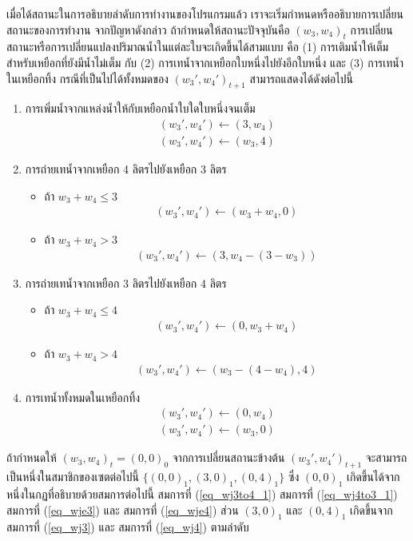 \par{
เมื่อได้สถานะในการอธิบายลำดับการทำงานของโปรแกรมแล้ว 
เราจะเริ่มกำหนดหรืออธิบายการเปลี่ยนสถานะของการทำงาน
จากปัญหาดังกล่าว 
ถ้ากำหนดให้สถานะปัจจุบันคือ $(w_3, w_4)_t$ 
การเปลี่ยนสถานะหรือการเปลี่ยนแปลงปริมาณน้ำในแต่ละใบจะเกิดขึ้นได้สามแบบ
คือ (1) การเติมน้ำให้เต็มสำหรับเหยือกที่ยังมีน้ำไม่เต็ม กับ 
(2) การเทน้ำจากเหยือกใบหนึ่งไปยังอีกใบหนึ่ง และ (3) การเทน้ำในเหยือกทิ้ง
กรณีที่เป็นไปได้ทั้งหมดของ $(w_3',w_4')_{t+1}$ 
สามารถแสดงได้ดังต่อไปนี้
\begin{enumerate}
\item การเพิ่มน้ำจากแหล่งน้ำให้กับเหยือกน้ำใบใดใบหนึ่งจนเต็ม 
\begin{eqnarray}
(w_3',w_4') \leftarrow (3, w_4) \label{eq_wj3} \\
(w_3',w_4') \leftarrow (w_3, 4) \label{eq_wj4}
\end{eqnarray}
\item การถ่ายเทน้ำจากเหยือก 4 ลิตรไปยังเหยือก 3 ลิตร
\begin{itemize}
\item ถ้า $w_3 + w_4 \le 3$ 
\begin{eqnarray}
(w_3',w_4') \leftarrow (w_3+w_4, 0) \label{eq_wj4to3_1}
\end{eqnarray}
\item ถ้า $w_3 + w_4 > 3$ 
\begin{eqnarray}
(w_3',w_4') \leftarrow (3, w_4-(3-w_3)) \label{eq_wj4to3_2}
\end{eqnarray}
\end{itemize}
\item การถ่ายเทน้ำจากเหยือก 3 ลิตรไปยังเหยือก 4 ลิตร
\begin{itemize}
\item ถ้า $w_3 + w_4 \le 4$ 
\begin{eqnarray}
(w_3',w_4') \leftarrow (0, w_3+w_4) \label{eq_wj3to4_1}
\end{eqnarray}
\item ถ้า $w_3 + w_4 > 4$ 
\begin{eqnarray}
(w_3',w_4') \leftarrow (w_3-(4-w_4),4) \label{eq_wj3to4_2}
\end{eqnarray}
\end{itemize}
\item การเทน้ำทั้งหมดในเหยือกทิ้ง
\begin{eqnarray}
(w_3',w_4') \leftarrow (0, w_4) \label{eq_wje3} \\
(w_3',w_4') \leftarrow (w_3, 0) \label{eq_wje4}
\end{eqnarray}
\end{enumerate}
%
ถ้ากำหนดให้ $(w_3,w_4)_t = (0,0)_0$ จากการเปลี่ยนสถานะข้างต้น $(w_3',w_4')_{t+1}$ 
จะสามารถเป็นหนึ่งในสมาชิกของเซตต่อไปนี้ $\{(0,0)_1,(3,0)_1,(0,4)_1\}$ ซึ่ง 
$(0,0)_1$ เกิดขึ้นได้จากหนึ่งในกฏที่อธิบายด้วยสมการต่อไปนี้ สมการที่ (\ref{eq_wj3to4_1})  
สมการที่ (\ref{eq_wj4to3_1}) สมการที่ (\ref{eq_wje3}) และ 
สมการที่ (\ref{eq_wje4})
ส่วน $(3,0)_1$ และ $(0,4)_1$ เกิดขึ้นจาก 
สมการที่ (\ref{eq_wj3}) และ สมการที่ (\ref{eq_wj4}) ตามลำดับ
}
